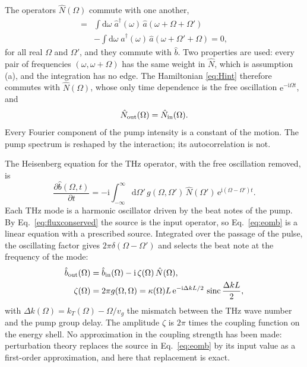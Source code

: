 \documentclass[aps,pra,reprint,superscriptaddress,amsmath,amssymb,floatfix]{revtex4-2}
\newcommand{\Nop}{\hat N}
\newcommand{\dd}{\mathrm{d}}
\newcommand{\ee}{\mathrm{e}}
\newcommand{\ii}{\mathrm{i}}
\newcommand{\sinc}{\operatorname{sinc}}
\begin{document}
The operators $\Nop(\Omega)$ commute with one another,
\begin{align}
[\Nop(\Omega),\Nop(\Omega')]={}&\int\!\dd\omega\;\hat a^\dagger(\omega)\,\hat a(\omega+\Omega+\Omega')\nonumber\\
&-\int\!\dd\omega\;\hat a^\dagger(\omega)\,\hat a(\omega+\Omega'+\Omega)=0,
\label{eq:commute}
\end{align}
for all real $\Omega$ and $\Omega'$, and they commute with $\hat b$. Two
properties are used: every pair of frequencies $(\omega,\omega+\Omega)$ has
the same weight in $\Nop$, which is assumption (a), and the integration has
no edge. The Hamiltonian \eqref{eq:Hint} therefore commutes with
$\Nop(\Omega)$, whose only time dependence is the free oscillation
$\ee^{-\ii\Omega t}$, and
\begin{equation}
\Nop_{\rm out}(\Omega)=\Nop_{\rm in}(\Omega).
\label{eq:fluxconserved}
\end{equation}
Every Fourier component of the pump intensity is a constant of the motion.
The pump spectrum is reshaped by the interaction; its autocorrelation is not.

The Heisenberg equation for the THz operator, with the free oscillation
removed, is
\begin{equation}
\frac{\partial\hat b(\Omega,t)}{\partial t}
=-\ii\!\int_{-\infty}^{\infty}\!\!\dd\Omega'\,g(\Omega,\Omega')\,\Nop(\Omega')\,
\ee^{\ii(\Omega-\Omega')t} .
\label{eq:eomb}
\end{equation}
Each THz mode is a harmonic oscillator driven by the beat notes of the pump.
By Eq.~\eqref{eq:fluxconserved} the source is the input operator, so
Eq.~\eqref{eq:eomb} is a linear equation with a prescribed source. Integrated
over the passage of the pulse, the oscillating factor gives
$2\pi\delta(\Omega-\Omega')$ and selects the beat note at the frequency of the
mode:
\begin{align}
\hat b_{\rm out}(\Omega)&=\hat b_{\rm in}(\Omega)-\ii\,\zeta(\Omega)\,\Nop(\Omega),
\label{eq:inout}\\
\zeta(\Omega)&=2\pi g(\Omega,\Omega)
=\kappa(\Omega)L\,\ee^{-\ii\Delta kL/2}\,\sinc\frac{\Delta kL}{2},
\label{eq:zeta}
\end{align}
with $\Delta k(\Omega)=k_T(\Omega)-\Omega/v_g$ the mismatch between the THz
wave number and the pump group delay. The amplitude $\zeta$ is $2\pi$ times
the coupling function on the energy shell. No approximation in the coupling
strength has been made: perturbation theory replaces the source in
Eq.~\eqref{eq:eomb} by its input value as a first-order approximation, and
here that replacement is exact.
\end{document}
